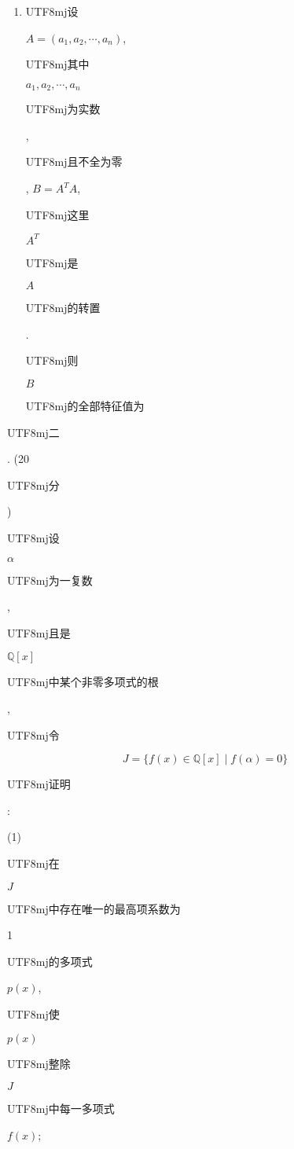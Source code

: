 \documentclass[10pt]{article}
\begin{document}
\begin{enumerate}
  \item \begin{CJK}{UTF8}{mj}设\end{CJK} $A=\left(a_{1}, a_{2}, \cdots, a_{n}\right)$, \begin{CJK}{UTF8}{mj}其中\end{CJK} $a_{1}, a_{2}, \cdots, a_{n}$ \begin{CJK}{UTF8}{mj}为实数\end{CJK}, \begin{CJK}{UTF8}{mj}且不全为零\end{CJK}, $B=A^{T} A$, \begin{CJK}{UTF8}{mj}这里\end{CJK} $A^{T}$ \begin{CJK}{UTF8}{mj}是\end{CJK} $A$ \begin{CJK}{UTF8}{mj}的转置\end{CJK}. \begin{CJK}{UTF8}{mj}则\end{CJK} $B$ \begin{CJK}{UTF8}{mj}的全部特征值为\end{CJK}

\end{enumerate}
\begin{CJK}{UTF8}{mj}二\end{CJK}. (20 \begin{CJK}{UTF8}{mj}分\end{CJK}) \begin{CJK}{UTF8}{mj}设\end{CJK} $\alpha$ \begin{CJK}{UTF8}{mj}为一复数\end{CJK}, \begin{CJK}{UTF8}{mj}且是\end{CJK} $\mathbb{Q}[x]$ \begin{CJK}{UTF8}{mj}中某个非零多项式的根\end{CJK}, \begin{CJK}{UTF8}{mj}令\end{CJK}
$$
J=\{f(x) \in \mathbb{Q}[x] \mid f(\alpha)=0\}
$$
\begin{CJK}{UTF8}{mj}证明\end{CJK}:

(1) \begin{CJK}{UTF8}{mj}在\end{CJK} $J$ \begin{CJK}{UTF8}{mj}中存在唯一的最高项系数为\end{CJK} 1 \begin{CJK}{UTF8}{mj}的多项式\end{CJK} $p(x)$, \begin{CJK}{UTF8}{mj}使\end{CJK} $p(x)$ \begin{CJK}{UTF8}{mj}整除\end{CJK} $J$ \begin{CJK}{UTF8}{mj}中每一多项式\end{CJK} $f(x)$;
\end{document}
